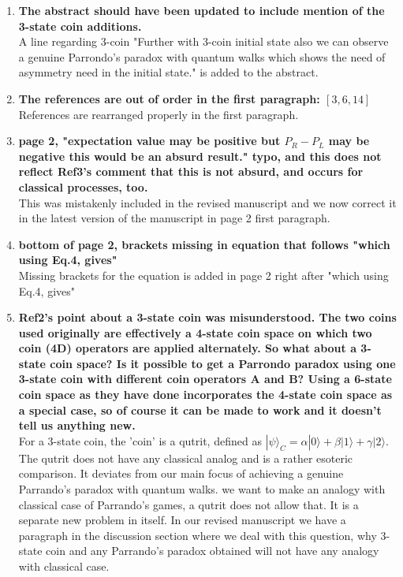 \documentclass[12pt]{article}
\begin{document}
\begin{enumerate}
\item \textbf{The abstract should have been updated to include mention of the
3-state coin additions.}\\
A line regarding 3-coin "Further with 3-coin initial state also we can observe a genuine Parrondo's paradox with quantum walks which shows the need of asymmetry need in the initial state." is added to the abstract.
\item \textbf{The references are out of order in the first paragraph: $[3,6,14]$}\\
References are rearranged properly in the first paragraph.
\item \textbf{page 2, "expectation value may be positive but $P_R - P_L$ may be
negative this would be an absurd result." typo, and this does not
reflect Ref3's comment that this is not absurd, and occurs for
classical processes, too.}\\
This was mistakenly included in the revised manuscript and we now correct it in the latest version of the manuscript in page 2 first paragraph.
\item \textbf{bottom of page 2, brackets missing in equation that follows "which
using Eq.4, gives"}\\
Missing brackets for the equation is added in page 2 right after "which using Eq.4, gives" 
\item \textbf{Ref2's point about a 3-state coin was misunderstood. The two coins
used originally are effectively a 4-state coin space on which two coin
(4D) operators are applied alternately. So what about a 3-state coin
space? Is it possible to get a Parrondo paradox using one 3-state coin
with different coin operators A and B? Using a 6-state coin space as
they have done incorporates the 4-state coin space as a special case,
so of course it can be made to work and it doesn't tell us anything
new.}\\
For a 3-state coin, the 'coin' is a qutrit, defined as $| \psi \rangle_C= \alpha|0\rangle + \beta|1 \rangle + \gamma|2 \rangle$.\\
The qutrit does not have any classical analog and is a rather esoteric comparison. It deviates from our main focus of achieving a genuine Parrando's paradox with quantum walks. we want to make an analogy with classical case of Parrando's games, a qutrit does not allow that. It is a separate new problem in itself. In our revised manuscript we have a paragraph in the discussion section where we deal with this question, why 3-state coin and any Parrando's paradox obtained will not have any analogy with classical case.

\end{enumerate}
\end{document}
